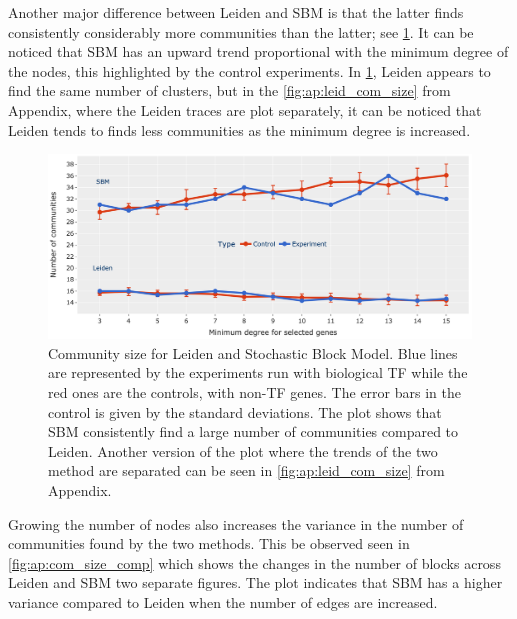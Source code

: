 Another major difference between Leiden and SBM is that the latter finds consistently considerably more communities than the latter; see \cref{fig:N_I:comp_size_com_det}. It can be noticed that SBM has an upward trend proportional with the minimum degree of the nodes, this highlighted by the control experiments. In \cref{fig:N_I:comp_size_com_det}, Leiden appears to find the same number of clusters, but in the \cref{fig:ap:leid_com_size} from Appendix, where the Leiden traces are plot separately, it can be noticed that Leiden tends to finds less communities as the minimum degree is increased. 

\begin{figure}[!t]   
    \centering
    \includegraphics[width=1.0\textwidth,keepaspectratio]{Sections/Network_I/Resources/selective_pruning/com_comp/sbm_Leiden_combNum.png}
      \caption[Leiden vs SBM: Number of communities found]{Community size for Leiden and Stochastic Block Model. Blue lines are represented by the experiments run with biological TF while the red ones are the controls, with non-TF genes. The error bars in the control is given by the standard deviations. The plot shows that SBM consistently find a large number of communities compared to Leiden. Another version of the plot where the trends of the two method are separated can be seen in \cref{fig:ap:leid_com_size} from Appendix.}
    \label{fig:N_I:comp_size_com_det}
\end{figure}

Growing the number of nodes also increases the variance in the number of communities found by the two methods. This be observed seen in \cref{fig:ap:com_size_comp} which shows the changes in the number of blocks across Leiden and SBM two separate figures. The plot indicates that SBM has a higher variance compared to Leiden when the number of edges are increased.

